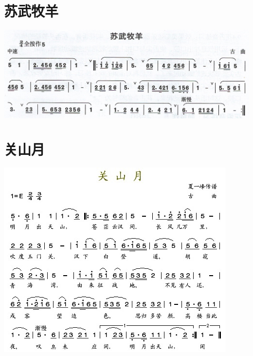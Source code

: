 \documentclass[cn,pad,twocol]{elegantbook}
\begin{document}
\section{苏武牧羊}  \includegraphics[width=\textwidth]{dongxiao/20200711-苏武牧羊.jpeg}
\section{关山月}    \includegraphics[width=\textwidth]{dongxiao/20200411-清平乐-关山月.jpg}
\end{document}
